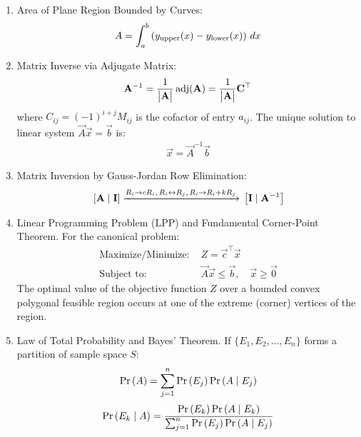 \begin{enumerate}[label=\thesubsection.\arabic*, ref=\thesubsection.\theenumi]
		\item Area of Plane Region Bounded by Curves:
		\begin{align}
			A = \int_{a}^{b} \left(y_{\text{upper}}(x) - y_{\text{lower}}(x)\right) \, dx \label{eq:CBSE12-2019-area_curves}
		\end{align}
		
		\item Matrix Inverse via Adjugate Matrix:
		\begin{align}
			\mathbf{A}^{-1} = \frac{1}{\begin{vmatrix}\mathbf{A}\end{vmatrix}} \operatorname{adj}(\mathbf{A}) = \frac{1}{\begin{vmatrix}\mathbf{A}\end{vmatrix}} \mathbf{C}^\top \label{eq:CBSE12-2019-inv_adjugate}
		\end{align}
		where $C_{ij} = (-1)^{i+j} M_{ij}$ is the cofactor of entry $a_{ij}$.
		The unique solution to linear system $\vec{A}\vec{x} = \vec{b}$ is:
		\begin{align}
			\vec{x} = \vec{A}^{-1}\vec{b} \label{eq:CBSE12-2019-matrix_linear_sol}
		\end{align}
		
		\item Matrix Inversion by Gauss-Jordan Row Elimination:
		\begin{align}
			{}\left[\mathbf{A} \mid \mathbf{I}\right] \xrightarrow{R_i \to c R_i, \, R_i \leftrightarrow R_j, \, R_i \to R_i + k R_j} {}\left[\mathbf{I} \mid \mathbf{A}^{-1}\right] \label{eq:CBSE12-2019-gauss_jordan}
		\end{align}
		
		\item Linear Programming Problem (LPP) and Fundamental Corner-Point Theorem.
		For the canonical problem:
		\begin{align}
			\text{Maximize/Minimize: } & Z = \vec{c}^\top \vec{x} \label{eq:CBSE12-2019-lpp_obj} \\
			\text{Subject to: } & \vec{A}\vec{x} \le \vec{b}, \quad \vec{x} \ge \vec{0} \label{eq:CBSE12-2019-lpp_constraints}
		\end{align}
		The optimal value of the objective function $Z$ over a bounded convex polygonal feasible region occurs at one of the extreme (corner) vertices of the region.
		
		\item Law of Total Probability and Bayes' Theorem.
		If $\{E_1, E_2, \dots, E_n\}$ forms a partition of sample space $S$:
		\begin{align}
			\Pr\left(A\right) = \sum_{j=1}^{n} \Pr\left(E_j\right) \Pr\left(A \mid E_j\right) \label{eq:CBSE12-2019-total_prob}
		\end{align}
		\begin{align}
			\Pr\left(E_k \mid A\right) = \frac{\Pr\left(E_k\right) \Pr\left(A \mid E_k\right)}{\sum_{j=1}^{n} \Pr\left(E_j\right) \Pr\left(A \mid E_j\right)} \label{eq:CBSE12-2019-bayes_theorem}
		\end{align}
		

\end{enumerate}
